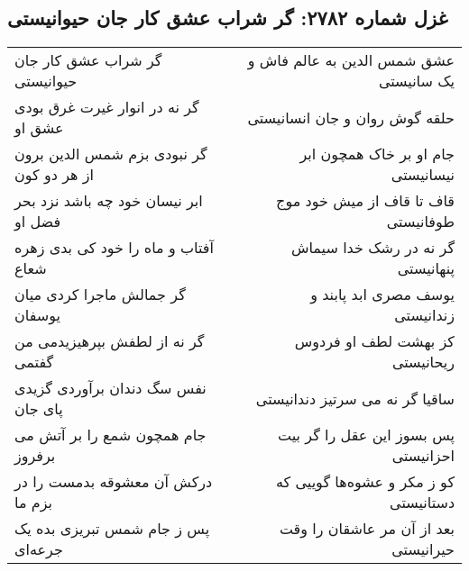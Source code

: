 \begin{center}
\section*{غزل شماره ۲۷۸۲: گر شراب عشق کار جان حیوانیستی}
\label{sec:2782}
\begin{longtable}{l p{0.5cm} r}
گر شراب عشق کار جان حیوانیستی
&&
عشق شمس الدین به عالم فاش و یک سانیستی
\\
گر نه در انوار غیرت غرق بودی عشق او
&&
حلقه گوش روان و جان انسانیستی
\\
گر نبودی بزم شمس الدین برون از هر دو کون
&&
جام او بر خاک همچون ابر نیسانیستی
\\
ابر نیسان خود چه باشد نزد بحر فضل او
&&
قاف تا قاف از میش خود موج طوفانیستی
\\
آفتاب و ماه را خود کی بدی زهره شعاع
&&
گر نه در رشک خدا سیماش پنهانیستی
\\
گر جمالش ماجرا کردی میان یوسفان
&&
یوسف مصری ابد پابند و زندانیستی
\\
گر نه از لطفش بپرهیزیدمی من گفتمی
&&
کز بهشت لطف او فردوس ریحانیستی
\\
نفس سگ دندان برآوردی گزیدی پای جان
&&
ساقیا گر نه می سرتیز دندانیستی
\\
جام همچون شمع را بر آتش می برفروز
&&
پس بسوز این عقل را گر بیت احزانیستی
\\
درکش آن معشوقه بدمست را در بزم ما
&&
کو ز مکر و عشوه‌ها گوییی که دستانیستی
\\
پس ز جام شمس تبریزی بده یک جرعه‌ای
&&
بعد از آن مر عاشقان را وقت حیرانیستی
\\
\end{longtable}
\end{center}
